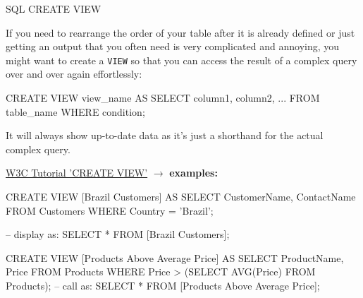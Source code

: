 \begin{frame}{SQL CREATE VIEW}

  If you need to rearrange the order of your table after it is already defined or just getting an output that you often need is very complicated and annoying, you might want to create a \texttt{VIEW} so that you can access the result of a complex query over and over again effortlessly:
  \begin{sqlcode}
CREATE VIEW view_name AS
SELECT column1, column2, ...
FROM table_name
WHERE condition; 
  \end{sqlcode}
  It will always show up-to-date data as it's just a shorthand for the actual complex query. 
  \framebreak
  
  \href{https://www.w3schools.com/sql/sql_view.asp}{W3C Tutorial 'CREATE VIEW'} $\to$ \textbf{examples:}
        \begin{sqlcode}
CREATE VIEW [Brazil Customers] AS
SELECT CustomerName, ContactName
FROM Customers
WHERE Country = 'Brazil';

-- display as:
SELECT * FROM [Brazil Customers]; 
  \end{sqlcode}

        \begin{sqlcode}
CREATE VIEW [Products Above Average Price] AS
SELECT ProductName, Price
FROM Products
WHERE Price > (SELECT AVG(Price) FROM Products); 
-- call as:
SELECT * FROM [Products Above Average Price]; 
  \end{sqlcode}


\end{frame}


